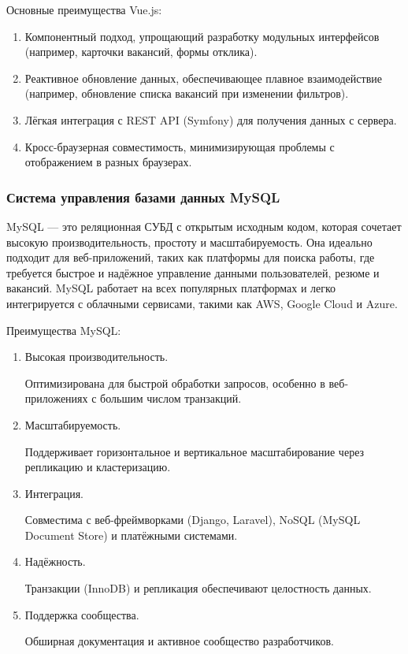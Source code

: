 Основные преимущества Vue.js:

\begin{enumerate}
	\item Компонентный подход, упрощающий разработку модульных интерфейсов (например, карточки вакансий, формы отклика).
	\item Реактивное обновление данных, обеспечивающее плавное взаимодействие (например, обновление списка вакансий при изменении фильтров).
	\item Лёгкая интеграция с REST API (Symfony) для получения данных с сервера.
	\item Кросс-браузерная совместимость, минимизирующая проблемы с отображением в разных браузерах.
\end{enumerate}

\subsubsection{Система управления базами данных MySQL}

MySQL — это реляционная СУБД с открытым исходным кодом, которая сочетает высокую производительность, простоту и масштабируемость. Она идеально подходит для веб-приложений, таких как платформы для поиска работы, где требуется быстрое и надёжное управление данными пользователей, резюме и вакансий. MySQL работает на всех популярных платформах и легко интегрируется с облачными сервисами, такими как AWS, Google Cloud и Azure.

Преимущества MySQL:

\begin{enumerate}
	\item Высокая производительность. 
	
	Оптимизирована для быстрой обработки запросов, особенно в веб-приложениях с большим числом транзакций.
	
	\item Масштабируемость. 
	
	Поддерживает горизонтальное и вертикальное масштабирование через репликацию и кластеризацию.
	
	\item Интеграция. 
	
	Совместима с веб-фреймворками (Django, Laravel), NoSQL (MySQL Document Store) и платёжными 
	системами.
	
	\item Надёжность. 
	
	Транзакции (InnoDB) и репликация обеспечивают целостность данных.
	
	\item Поддержка сообщества. 
	
	Обширная документация и активное сообщество разработчиков.
\end{enumerate}

